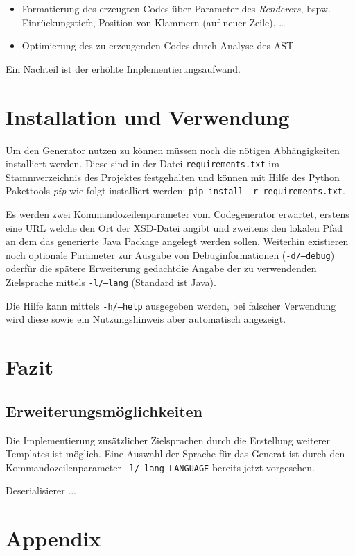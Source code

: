\documentclass[a4paper]{scrartcl}
\begin{document}
    \begin{itemize}
        \item Formatierung des erzeugten Codes über Parameter des \emph{Renderers}, bspw. Einrückungstiefe, Position von Klammern (auf neuer Zeile), \ldots
        \item Optimierung des zu erzeugenden Codes durch Analyse des \gls{AST}
    \end{itemize}

    Ein Nachteil ist der erhöhte Implementierungsaufwand.

    \section{Installation und Verwendung}

    Um den Generator nutzen zu können müssen noch die nötigen Abhängigkeiten installiert werden. Diese sind in der Datei \texttt{requirements.txt} im Stammverzeichnis des Projektes festgehalten und können mit Hilfe des Python Pakettools \emph{pip} wie folgt installiert werden: \texttt{pip install -r requirements.txt}.

    Es werden zwei Kommandozeilenparameter vom Codegenerator erwartet, erstens eine \gls{URL} welche den Ort der \gls{XSD}-Datei angibt und zweitens den lokalen Pfad an dem das generierte Java Package angelegt werden sollen. Weiterhin existieren noch optionale Parameter zur Ausgabe von Debuginformationen (\texttt{-d/--debug}) oder\textemdash{}für die spätere Erweiterung gedacht\textemdash{}die Angabe der zu verwendenden Zielsprache mittels \texttt{-l/--lang} (Standard ist Java).

    Die Hilfe kann mittels \texttt{-h/--help} ausgegeben werden, bei falscher Verwendung wird diese sowie ein Nutzungshinweis aber automatisch angezeigt.

    \section{Fazit}

    \subsection{Erweiterungsmöglichkeiten}
    \label{sec:erweiterung}

    Die Implementierung zusätzlicher Zielsprachen durch die Erstellung weiterer Templates ist möglich. Eine Auswahl der Sprache für das Generat ist durch den Kommandozeilenparameter \texttt{-l/--lang LANGUAGE} bereits jetzt vorgesehen.

    Deserialisierer ...

    \clearpage
    \section{Appendix}

    \printglossary[type=main,title={Glossar},toctitle={Glossar}]

    \printbibliography
\end{document}
